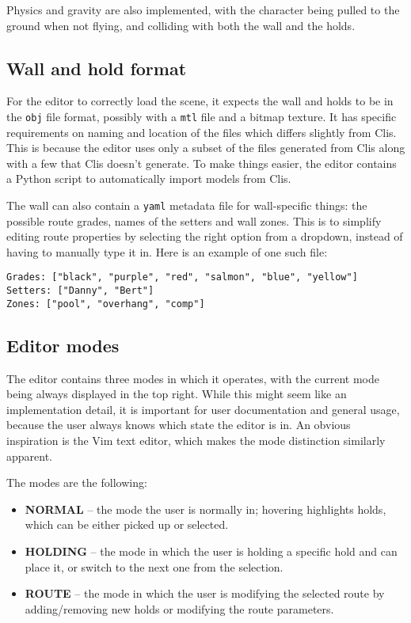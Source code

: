 Physics and gravity are also implemented, with the character being pulled to the ground when not flying, and colliding with both the wall and the holds.

\subsection{Wall and hold format}
For the editor to correctly load the scene, it expects the wall and holds to be in the \verb|obj| file format, possibly with a \verb|mtl| file and a bitmap texture.
It has specific requirements on naming and location of the files which differs slightly from Clis.
This is because the editor uses only a subset of the files generated from Clis along with a few that Clis doesn't generate.
To make things easier, the editor contains a Python script to automatically import models from Clis.

The wall can also contain a \verb|yaml| metadata file for wall-specific things: the possible route grades, names of the setters and wall zones.
This is to simplify editing route properties by selecting the right option from a dropdown, instead of having to manually type it in.
Here is an example of one such file:

\begin{verbatim}
Grades: ["black", "purple", "red", "salmon", "blue", "yellow"]
Setters: ["Danny", "Bert"]
Zones: ["pool", "overhang", "comp"]
\end{verbatim}

\subsection{Editor modes}
The editor contains three modes in which it operates, with the current mode being always displayed in the top right.
While this might seem like an implementation detail, it is important for user documentation and general usage, because the user always knows which state the editor is in.
An obvious inspiration is the Vim text editor, which makes the mode distinction similarly apparent.

The modes are the following:

\begin{itemize}
	\item \textbf{NORMAL} -- the mode the user is normally in; hovering highlights holds, which can be either picked up or selected.
	\item \textbf{HOLDING} -- the mode in which the user is holding a specific hold and can place it, or switch to the next one from the selection.
	\item \textbf{ROUTE} -- the mode in which the user is modifying the selected route by adding/removing new holds or modifying the route parameters.
\end{itemize}

